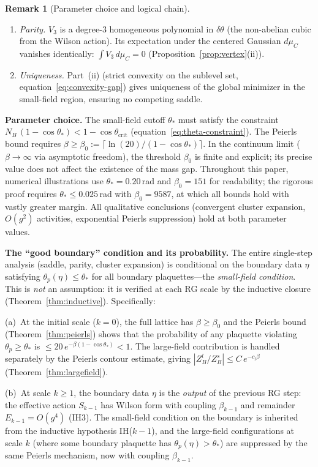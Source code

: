 \documentclass[11pt]{article}
\theoremstyle{definition}
\newtheorem{remark}[theorem]{Remark}
\begin{document}
\begin{remark}[Parameter choice and logical chain]
\begin{enumerate}
\item \emph{Parity.}  $V_3$ is a degree-3 homogeneous
polynomial in $\delta\theta$ (the non-abelian cubic from the
Wilson action).  Its expectation under the centered Gaussian
$d\mu_C$ vanishes identically:
$\int V_3\,d\mu_C=0$ (Proposition~\ref{prop:vertex}(ii)).

\item \emph{Uniqueness.}  Part~(ii) (strict convexity on the
sublevel set, equation~\eqref{eq:convexity-gap}) gives
uniqueness of the global minimizer in the
small-field region, ensuring no competing saddle.
\end{enumerate}

\textbf{Parameter choice.}
The small-field cutoff $\theta_*$ must satisfy the constraint
$N_B\,(1-\cos\theta_*)<1-\cos\theta_{\mathrm{crit}}$
(equation~\eqref{eq:theta-constraint}).
The Peierls bound requires
$\beta\ge\beta_0:=\lceil\ln(20)/(1-\cos\theta_*)\rceil$.
In the continuum limit ($\beta\to\infty$ via asymptotic freedom),
the threshold $\beta_0$ is finite and explicit; its precise
value does not affect the existence of the mass gap.
Throughout this paper, numerical illustrations use
$\theta_*=0.20$\,rad and $\beta_0=151$ for readability;
the rigorous proof requires $\theta_*\le 0.025$\,rad
with $\beta_0=9587$, at which all bounds hold with
vastly greater margin.
All qualitative conclusions (convergent cluster expansion,
$O(g^2)$ activities, exponential Peierls suppression) hold
at both parameter values.

\textbf{The ``good boundary'' condition and its probability.}
The entire single-step analysis (saddle, parity, cluster expansion)
is conditional on the boundary data $\eta$ satisfying
$\theta_p(\eta)\le\theta_*$ for all boundary plaquettes---the
\emph{small-field condition}.  This is \emph{not} an assumption:
it is verified at each RG scale by the inductive closure
(Theorem~\ref{thm:inductive}).  Specifically:

(a)~At the initial scale ($k=0$), the full lattice has $\beta\ge\beta_0$
and the Peierls bound (Theorem~\ref{thm:peierls}) shows that the
probability of any plaquette violating $\theta_p\ge\theta_*$ is
$\le 20\,e^{-\beta(1-\cos\theta_*)}<1$.  The large-field
contribution is handled separately by the Peierls contour estimate,
giving $|Z_B^l/Z_B^s|\le C\,e^{-c_l\beta}$
(Theorem~\ref{thm:largefield}).

(b)~At scale $k\ge 1$, the boundary data $\eta$ is the
\emph{output} of the previous RG step: the effective action
$S_{k-1}$ has Wilson form with coupling $\beta_{k-1}$
and remainder $E_{k-1}=O(g^4)$ (IH3).  The small-field
condition on the boundary is inherited from the inductive
hypothesis IH($k-1$), and the large-field configurations
at scale $k$ (where some boundary plaquette has
$\theta_p(\eta)>\theta_*$) are suppressed by the same
Peierls mechanism, now with coupling $\beta_{k-1}$.


\end{remark}
\end{document}
